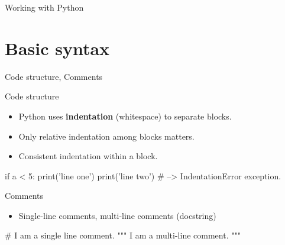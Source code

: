 \documentclass[10pt]{beamer}
\newcommand\darrow{\parbox{3cm}{\centering$\downarrow$}\smallskip}
\begin{document}

\begin{frame}{Working with Python}


\end{frame}

\section{Basic syntax}


\begin{frame}[fragile]{Code structure, Comments}

	Code structure
	\begin{itemize}
		\item \pause Python uses \textbf{indentation} (whitespace) to separate blocks.
		\item \pause Only relative indentation among blocks matters.
		\item \pause Consistent indentation within a block.
	\end{itemize}
	
	\pause
    \begin{pythoncode}
		if a < 5:
		    print('line one')
		      print('line two')  # --> IndentationError exception.
    \end{pythoncode}

    \pause
    
    Comments
    \begin{itemize}
	\item \pause Single-line comments, multi-line comments (docstring)
    \end{itemize}

	\pause
	 \begin{pythoncode}
	# I am a single line comment.
	""" I am 
	a multi-line comment. """
	\end{pythoncode}
	
%
%

\end{frame}
\end{document}
